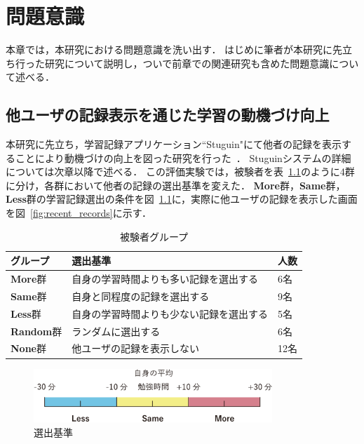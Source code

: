 \chapter{問題意識}
本章では，本研究における問題意識を洗い出す．
はじめに筆者が本研究に先立ち行った研究について説明し，ついで前章での関連研究も含めた問題意識について述べる．

\section{他ユーザの記録表示を通じた学習の動機づけ向上}
本研究に先立ち，学習記録アプリケーション``Stuguin"にて他者の記録を表示することにより動機づけの向上を図った研究を行った~\cite{hashiba}．
Stuguinシステムの詳細については次章以降で述べる．
この評価実験では，被験者を表~\ref{tb:pre_group}のように4群に分け，各群において他者の記録の選出基準を変えた．
{\bf More}群，{\bf Same}群，{\bf Less}群の学習記録選出の条件を図~\ref{fig:election}に，実際に他ユーザの記録を表示した画面を図~\ref{fig:recent_records}に示す．

\begin{table}[htb]
\begin{center}
  \begin{tabular}{|l|l|l|} \hline
    グループ & 選出基準 & 人数 \\ \hline
	{\bf More}群 & 自身の学習時間よりも多い記録を選出する & 6名 \\
    {\bf Same}群 & 自身と同程度の記録を選出する & 9名 \\
    {\bf Less}群 & 自身の学習時間よりも少ない記録を選出する & 5名 \\ 
	{\bf Random}群 & ランダムに選出する & 6名 \\
	{\bf None}群 & 他ユーザの記録を表示しない & 12名 \\ \hline
  \end{tabular}
  \caption{被験者グループ}
  \label{tb:pre_group}
\end{center}
\end{table}

\begin{figure}[htb]
	\begin{center}
	\includegraphics[width=9cm]{images/3/election.eps}
	\end{center}
	\caption{選出基準}
	\label{fig:election}
\end{figure}

